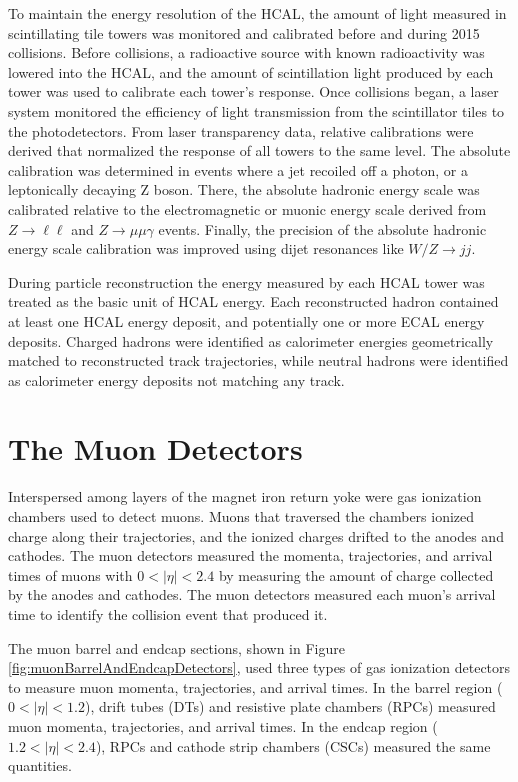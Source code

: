 To maintain the energy resolution of the HCAL, the amount of light measured in scintillating tile towers 
was monitored and calibrated before and during 2015 collisions.  Before collisions, a radioactive source 
with known radioactivity was lowered into the HCAL, and the amount of scintillation light produced by each 
tower was used to calibrate each tower's response.  Once collisions began, a laser system 
monitored the efficiency of light transmission from the scintillator tiles to the photodetectors.  
From laser transparency data, relative calibrations were derived that normalized the response of all towers 
to the same level.  The absolute 
calibration was determined in events where a jet recoiled off a photon, or a leptonically decaying Z boson.  
There, the absolute hadronic energy 
scale was calibrated relative to the electromagnetic or muonic energy scale derived from $Z \rightarrow \ell\ell$ 
and $Z \rightarrow \mu\mu\gamma$ events.  Finally, the precision of the absolute hadronic energy scale calibration 
was improved using dijet resonances like $W/Z \rightarrow jj$.

During particle reconstruction the energy measured by each HCAL tower was treated as the basic unit of HCAL energy.  
Each reconstructed hadron contained at least one HCAL energy deposit, and potentially one or more ECAL energy 
deposits.  Charged hadrons were identified as calorimeter energies geometrically matched to reconstructed 
track trajectories, while neutral hadrons were identified as calorimeter energy deposits not matching any 
track.


\section{The Muon Detectors}
\label{sec:muonDetectorsDescription}
Interspersed among layers of the magnet iron return yoke were gas ionization chambers used to detect muons.  Muons 
that traversed the chambers ionized charge along their trajectories, and the ionized charges drifted to the 
anodes and cathodes.  The muon detectors measured the momenta, trajectories, and arrival times of muons with $0 < |\eta| < 2.4$ by 
measuring the amount of charge collected by the anodes and cathodes.  The muon detectors measured each muon's arrival 
time to identify the collision event that produced it.

The muon barrel and endcap sections, shown in Figure \ref{fig:muonBarrelAndEndcapDetectors}, used three types of 
gas ionization detectors to measure muon momenta, trajectories, and arrival times.  In the barrel region ($0 < |\eta| < 1.2$), 
drift tubes (DTs) and resistive plate chambers (RPCs) measured muon momenta, trajectories, and arrival times.  In 
the endcap region ($1.2 < |\eta| < 2.4$), RPCs and cathode strip chambers (CSCs) measured the same quantities.

